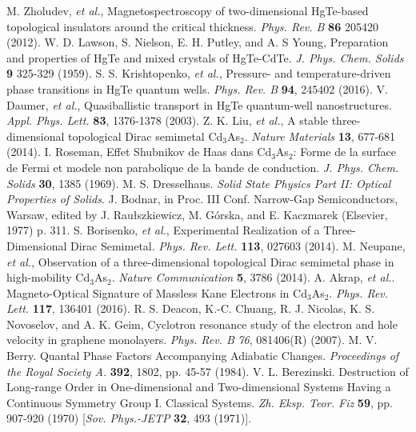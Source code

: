 \documentclass[titlepage,a4paper]{book}
\begin{document}
\begin{thebibliography}{99}
M. Zholudev, \textit{et al.}, Magnetospectroscopy of two-dimensional HgTe-based topological insulators around the critical thickness. \textit{Phys. Rev. B} \textbf{86} 205420 (2012).
W. D. Lawson, S. Nielson, E. H. Putley, and A. S Young, Preparation and properties of HgTe and mixed crystals of HgTe-CdTe. \textit{J. Phys. Chem. Solids} \textbf{9} 325-329 (1959).
S. S. Krishtopenko, \textit{et al.}, Pressure- and temperature-driven phase transitions in HgTe quantum wells. \textit{Phys. Rev. B} \textbf{94}, 245402 (2016).
V. Daumer, \textit{et al.}, Quasiballistic transport in HgTe quantum-well nanostructures. \textit{Appl. Phys. Lett.} \textbf{83}, 1376-1378 (2003).
Z. K. Liu, \textit{et al.}, A stable three-dimensional topological Dirac semimetal Cd$_3$As$_2$. \textit{Nature Materials} \textbf{13}, 677-681 (2014).  
I. Roseman, Effet Shubnikov de Haas dans Cd$_3$As$_2$: Forme de la surface de Fermi et modele non parabolique de la bande de conduction. \textit{J. Phys. Chem. Solids} \textbf{30}, 1385 (1969).
M. S. Dresselhaus. \textit{Solid State Physics Part II: Optical Properties of Solids}.
J. Bodnar, in Proc. III Conf. Narrow-Gap Semiconductors, Warsaw, edited by J. Raułszkiewicz, M. Górska, and E. Kaczmarek (Elsevier, 1977) p. 311.
S. Borisenko, \textit{et al.}, Experimental Realization of a Three-Dimensional Dirac Semimetal. \textit{Phys. Rev. Lett.} \textbf{113}, 027603 (2014).
M. Neupane, \textit{et al.}, Observation of a three-dimensional topological Dirac semimetal phase in high-mobility Cd$_3$As$_2$. \textit{Nature Communication} \textbf{5}, 3786 (2014).
A. Akrap, \textit{et al.}. Magneto-Optical Signature of Massless Kane Electrons in Cd$_3$As$_2$. \textit{Phys. Rev. Lett.} \textbf{117}, 136401 (2016). 
R. S. Deacon, K.-C. Chuang, R. J. Nicolas, K. S. Novoselov, and A. K. Geim, Cyclotron resonance study of the electron and hole velocity in graphene monolayers. \textit{Phys. Rev. B} \textit{76}, 081406(R) (2007).
M. V. Berry. Quantal Phase Factors Accompanying Adiabatic Changes. \textit{Proceedings of the Royal Society A.} \textbf{392}, 1802, pp. 45-57 (1984).
V. L. Berezinski. Destruction of Long-range Order in One-dimensional and Two-dimensional Systems Having a Continuous Symmetry Group I. Classical Systems. \textit{Zh. Eksp. Teor. Fiz} \textbf{59}, pp. 907-920 (1970) [\textit{Sov. Phys.-JETP} \textbf{32}, 493 (1971)].

\end{thebibliography}
\end{document}
